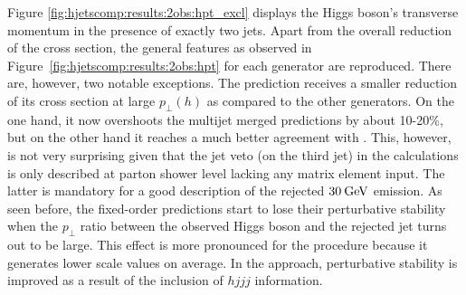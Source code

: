 Figure \ref{fig:hjetscomp:results:2obs:hpt_excl} displays the 
Higgs boson's transverse momentum in the presence of exactly two jets. 
Apart from the overall reduction of the cross section, the general 
features as observed in Figure~\ref{fig:hjetscomp:results:2obs:hpt}
for each generator are reproduced. There are, however, two notable
exceptions. The \Powheg \NNLOPS prediction receives a smaller
reduction of its cross section at large $p_\perp(h)$ as compared to
the other generators. On the one hand, it now overshoots the multijet
merged predictions by about 10-20\%, but on the other hand it reaches
a much better agreement with \Sherpa \NNLOPS. This, however, is not
very surprising given that the jet veto (on the third jet) in the
\NNLOPS calculations is only described at parton shower level lacking
any matrix element input. The latter is mandatory for a good
description of the rejected $30\text{\:GeV}$ emission. As seen before, the
fixed-order predictions start to lose their perturbative stability when
the $p_\perp$ ratio between the observed Higgs boson and the rejected
jet turns out to be large. This effect is more pronounced for the
\Minlo procedure because it generates lower scale values on
average. In the \Loopsim approach, perturbative stability is
improved as a result of the inclusion of $hjjj$ information.

